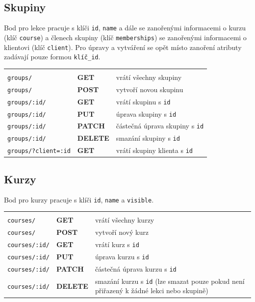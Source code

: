         \subsection{Skupiny}
        Bod pro lekce pracuje s klíči \verb|id|, \verb|name| a dále se zanořenými informacemi o kurzu (klíč \verb|course|) a  členech skupiny (klíč \verb|memberships|) se zanořenými informacemi o klientovi (klíč \verb|client|). Pro úpravy a vytváření se opět místo zanoření atributy zadávají pouze formou \verb|klíč_id|.
        
            {\centering
            \begin{tabular}{p{\apiA\textwidth} p{\apiB\textwidth} p{\apiC\textwidth}}&&\\
                \verb|groups/|              & \textbf{GET}      & vrátí všechny skupiny\\
                \verb|groups/|              & \textbf{POST}     & vytvoří novou skupinu\\
                \verb|groups/:id/|          & \textbf{GET}      & vrátí skupinu s \verb|id|\\
                \verb|groups/:id/|          & \textbf{PUT}      & úprava skupiny s \verb|id|\\
                \verb|groups/:id/|          & \textbf{PATCH}    & částečná úprava skupiny s \verb|id|\\
                \verb|groups/:id/|          & \textbf{DELETE}   & smazání skupiny s \verb|id|\\
                \verb|groups/?client=:id|   & \textbf{GET}      & vrátí skupiny klienta s \verb|id|\\
            \end{tabular}}
        
        \subsection{Kurzy}
        Bod pro kurzy pracuje s klíči \verb|id|, \verb|name| a \verb|visible|.
        
            {\centering
            \begin{tabular}{p{\apiA\textwidth} p{\apiB\textwidth} p{\apiC\textwidth}}&&\\
                \verb|courses/|             & \textbf{GET}      & vrátí všechny kurzy\\
                \verb|courses/|             & \textbf{POST}     & vytvoří nový kurz\\
                \verb|courses/:id/|         & \textbf{GET}      & vrátí kurz s \verb|id|\\
                \verb|courses/:id/|         & \textbf{PUT}      & úprava kurzu s \verb|id|\\
                \verb|courses/:id/|         & \textbf{PATCH}    & částečná úprava kurzu s \verb|id|\\
                \verb|courses/:id/|         & \textbf{DELETE}   & smazání kurzu s \verb|id| (lze smazat pouze pokud není přiřazený k žádné lekci nebo skupině)\\
            \end{tabular}}
            
